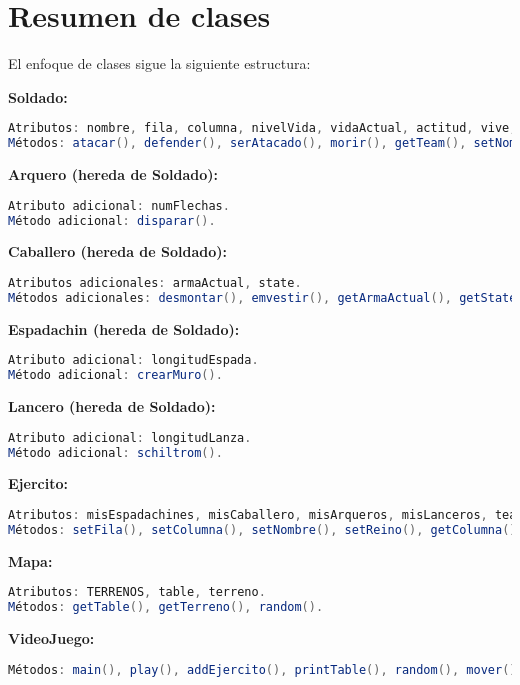 \section*{Resumen de clases}

El enfoque de clases sigue la siguiente estructura: 

\textbf{Soldado:}
\begin{lstlisting}[language=Java]
Atributos: nombre, fila, columna, nivelVida, vidaActual, actitud, vive, team.
Métodos: atacar(), defender(), serAtacado(), morir(), getTeam(), setNombre(), setFila(), setColumna(), setNivelVida(), getNombre(), getFila(), getColumna(), getNivelVida(), isLive(), toString(), random(), sumar(), getNumSoldados(), getNumTeam1(), getNumTeam2().
\end{lstlisting}

\textbf{Arquero (hereda de Soldado):}
\begin{lstlisting}[language=Java]
Atributo adicional: numFlechas.
Método adicional: disparar().
\end{lstlisting}

\textbf{Caballero (hereda de Soldado):}
\begin{lstlisting}[language=Java]
Atributos adicionales: armaActual, state.
Métodos adicionales: desmontar(), emvestir(), getArmaActual(), getState().
\end{lstlisting}

\textbf{Espadachin (hereda de Soldado):}
\begin{lstlisting}[language=Java]
Atributo adicional: longitudEspada.
Método adicional: crearMuro().
\end{lstlisting}

\textbf{Lancero (hereda de Soldado):}
\begin{lstlisting}[language=Java]
Atributo adicional: longitudLanza.
Método adicional: schiltrom().
\end{lstlisting}

\textbf{Ejercito:}
\begin{lstlisting}[language=Java]
Atributos: misEspadachines, misCaballero, misArqueros, misLanceros, team, columna, fila, nombre, reino.
Métodos: setFila(), setColumna(), setNombre(), setReino(), getColumna(), getFila(), getNombre(), getTeam(), getReino(), getMisArqueros(), getMisCaballeros(), getMisEspadachines(), getMisLanceros(), constructor con varias sobrecargas, addSoldados(), random(), toString().
\end{lstlisting}

\textbf{Mapa:}
\begin{lstlisting}[language=Java]
Atributos: TERRENOS, table, terreno.
Métodos: getTable(), getTerreno(), random().
\end{lstlisting}

\textbf{VideoJuego:}
\begin{lstlisting}[language=Java]
Métodos: main(), play(), addEjercito(), printTable(), random(), mover(), atacarEjercito(), atacar(), moverSoldados(), atacarSoldados().
\end{lstlisting}

